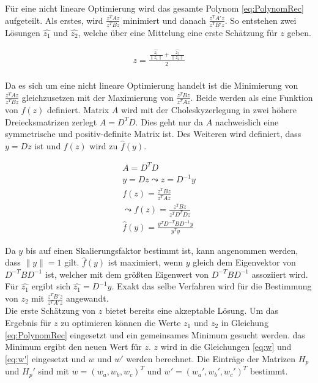 Für eine nicht lineare Optimierung wird das gesamte Polynom \ref{eq:PolynomRec} aufgeteilt. Als erstes, wird $\frac{z^TAz}{z^TBz}$ minimiert und danach $\frac{z^TA'z}{z^TB'z}$. So entstehen zwei Lösungen $\hat{z_1}$ und $\hat{z_2}$, welche über eine Mittelung eine erste Schätzung für $z$ geben\cite{ZZ}.

\begin{gather}
	z = \frac{\frac{\hat{z_1}}{\| z_1 \|}+\frac{\hat{z_2}}{\| z_2 \|}}{2}
\end{gather}\\

Da es sich um eine nicht lineare Optimierung handelt ist die Minimierung von  $\frac{z^TAz}{z^TBz}$ gleichzusetzen mit der Maximierung von  $\frac{z^TBz}{z^TAz}$. Beide werden als eine Funktion von $f(z)$ definiert. Matrix $A$ wird mit der Choleskyzerlegung\cite{FormelsammlungMatrizen} in zwei höhere Dreiecksmatrizen zerlegt $A = D^TD$. Dies geht nur da $A$ nachweislich eine symmetrische und positiv-definite Matrix ist\cite{Fortran77,FormelsammlungMatrizen}. Des Weiteren wird definiert, dass $y = Dz$ ist und $f(z)$ wird zu $\hat{f}(y)$\cite{ZZ}.

\begin{gather}
	A = D^TD\\
	y= Dz \leadsto z= D^{-1}y\\
	f(z)= \frac{z^TBz}{z^TAz}\\
	\leadsto 
	f(z)=\frac{z^TBz}{z^TD^TDz}\\
	\hat{f}(y)= \frac{y^TD^{-T}BD^{-1}y}{y^Ty}
\end{gather}

Da $y$ bis auf einen Skalierungsfaktor bestimmt ist, kann angenommen werden, dass $\parallel y \parallel = 1$ gilt. $\hat{f}(y)$ ist maximiert, wenn $y$ gleich dem Eigenvektor von $D^{-T}BD^{-1}$ ist, welcher mit dem größten Eigenwert von $D^{-T}BD^{-1}$ assoziiert wird\cite{ZZ}. Für $\hat{z_1}$ ergibt sich $\hat{z_1} = D^{-1}y$. Exakt das selbe Verfahren wird für die Bestimmung von $z_2$ mit  $\frac{z^TB'z}{z^TA'z}$ angewandt\cite{ZZ}.\\


Die erste Schätzung von $z$ bietet bereits eine akzeptable Lösung. Um das Ergebnis für $z$ zu optimieren können die Werte $z_1$ und $z_2$ in Gleichung \ref{eq:PolynomRec} eingesetzt und ein gemeinsames Minimum gesucht werden. das Minimum ergibt den neuen Wert für $z$. $z$ wird in die Gleichungen \ref{eq:w} und \ref{eq:w'} eingesetzt und $w$ und $w'$ werden berechnet. Die Einträge der Matrizen $H_p$ und $H_p'$ sind mit $w = (w_a,w_b,w_c)^T$ und $w' = (w_a',w_b',w_c')^T$ bestimmt\cite{ZZ}.\\

